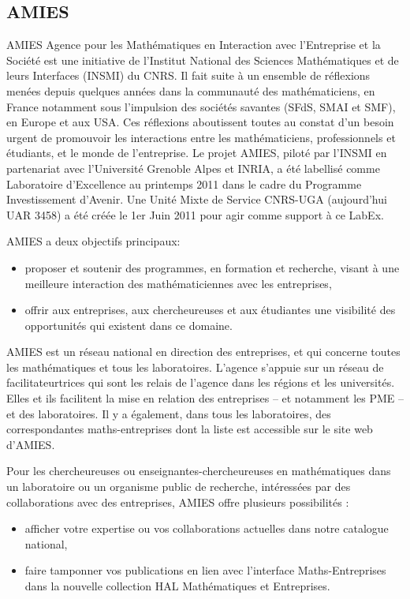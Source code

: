 \subsection{AMIES }
 \label{AMIES}

\noindent AMIES  \og{}Agence pour les Math\'ematiques en Interaction avec l'Entreprise
et la Soci\'et\'e\fg{}  est une initiative de l'Institut National des Sciences Math\'ematiques et de leurs Interfaces (INSMI) du CNRS. Il fait suite \`a un ensemble de r\'eflexions men\'ees depuis quelques ann\'ees dans la communaut\'e des math\'ematiciens, en France notamment sous l'impulsion des soci\'et\'es savantes (SFdS, SMAI et SMF), en Europe et aux USA. Ces r\'eflexions aboutissent toutes au constat d'un besoin urgent de promouvoir les interactions entre les math\'ematiciens, professionnels et \'etudiants, et le monde de l'entreprise. Le projet AMIES, pilot\'e par l'INSMI en partenariat avec l'Universit\'e Grenoble Alpes et INRIA, a \'et\'e labellis\'e comme Laboratoire d'Excellence au printemps 2011 dans le cadre du Programme Investissement d'Avenir. Une Unit\'e Mixte de Service CNRS-UGA (aujourd'hui UAR 3458) a \'et\'e cr\'e\'ee le 1er Juin 2011 pour agir comme support \`a ce LabEx.

AMIES a deux objectifs principaux:
\begin{itemize}
\item  proposer et soutenir des programmes, en formation et recherche,
  visant \`a une meilleure interaction des math\'ematicien\mp nes avec les  entreprises, 
\item offrir aux entreprises, aux chercheur\mp euse\mp s et aux \'etudiant\mp e\mp s
  une visibilit\'e des opportunit\'es qui existent dans ce domaine. 
\end{itemize}

AMIES est un r\'eseau national en direction des entreprises, et qui concerne toutes les
math\'ematiques et tous les laboratoires.  
L'agence  s'appuie sur un r\'eseau  de facilitateur\mp trices qui sont  les relais de l'agence dans les r\'egions et les universit\'es.
Elles et ils facilitent la mise en relation des entreprises -- et notamment les PME -- et des laboratoires.
Il y a \'egalement, dans tous les laboratoires, des correspondant\mp e\mp s maths-entreprises dont la liste est
accessible sur le site web d'AMIES.

Pour les chercheur\mp euse\mp s ou enseignant\mp e\mp s-chercheur\mp euse\mp s en math\'ematiques dans un laboratoire ou un organisme public de recherche,
int\'eress\'e\mp e\mp s par des collaborations avec des entreprises,  AMIES offre plusieurs possibilit\'es : 
\begin{itemize}
\item  afficher votre expertise ou vos collaborations
  actuelles dans notre catalogue national,
\item   faire tamponner vos publications en lien avec
  l'interface Maths-Entreprises dans la nouvelle collection HAL
  \og{}Math\'ematiques et Entreprises\fg{}.
\end{itemize}

